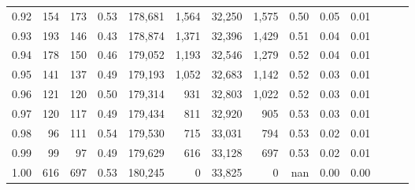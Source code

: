 \begin{tabular}{rrrrrrrrrrrrrr}
0.92 &    154 &  173 &  0.53 &  178,681 &    1,564 &  32,250 &   1,575 &  0.50 &  0.05 &      0.01 \\
0.93 &    193 &  146 &  0.43 &  178,874 &    1,371 &  32,396 &   1,429 &  0.51 &  0.04 &      0.01 \\
0.94 &    178 &  150 &  0.46 &  179,052 &    1,193 &  32,546 &   1,279 &  0.52 &  0.04 &      0.01 \\
0.95 &    141 &  137 &  0.49 &  179,193 &    1,052 &  32,683 &   1,142 &  0.52 &  0.03 &      0.01 \\
0.96 &    121 &  120 &  0.50 &  179,314 &      931 &  32,803 &   1,022 &  0.52 &  0.03 &      0.01 \\
0.97 &    120 &  117 &  0.49 &  179,434 &      811 &  32,920 &     905 &  0.53 &  0.03 &      0.01 \\
0.98 &     96 &  111 &  0.54 &  179,530 &      715 &  33,031 &     794 &  0.53 &  0.02 &      0.01 \\
0.99 &     99 &   97 &  0.49 &  179,629 &      616 &  33,128 &     697 &  0.53 &  0.02 &      0.01 \\
1.00 &    616 &  697 &  0.53 &  180,245 &        0 &  33,825 &       0 &   nan &  0.00 &      0.00 \\
\bottomrule
\end{tabular}

